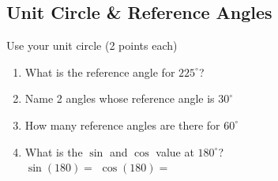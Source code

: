 \documentclass[12pt]{article}
\begin{document}
\subsection*{Unit Circle \& Reference Angles}

Use your unit circle (2 points each)\\

\begin{enumerate}[resume]

\item What is the reference angle for $225^\circ$?\\

\item Name 2 angles whose reference angle is $30^\circ$\\

\item How many reference angles are there for $60^\circ$\\

\item What is the $\sin$ and $\cos$ value at $180^\circ$?\\

$\sin(180)=$ \hspace{1in} $\cos(180)=$

\end{enumerate}
\end{document}

